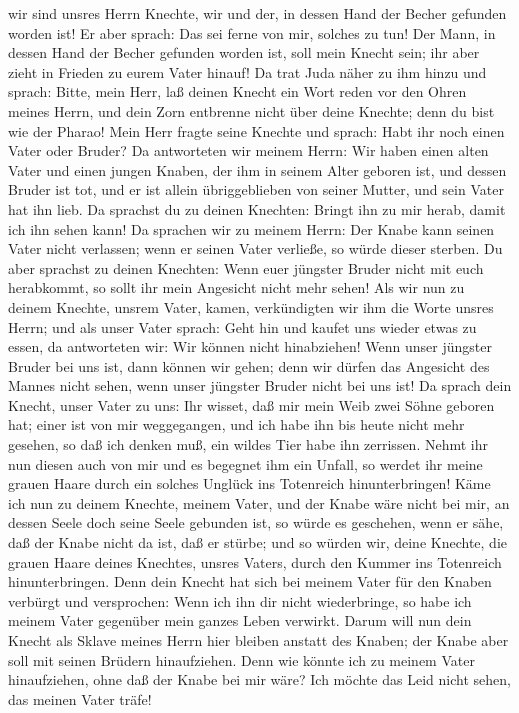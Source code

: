 wir sind unsres Herrn Knechte, wir und der, in dessen Hand der Becher
gefunden worden ist!  Er aber sprach: Das sei ferne von
mir, solches zu tun! Der Mann, in dessen Hand der Becher gefunden worden
ist, soll mein Knecht sein; ihr aber zieht in Frieden zu eurem Vater
hinauf!  Da trat Juda näher zu ihm hinzu und sprach:
Bitte, mein Herr, laß deinen Knecht ein Wort reden vor den Ohren meines
Herrn, und dein Zorn entbrenne nicht über deine Knechte; denn du bist
wie der Pharao!  Mein Herr fragte seine Knechte und
sprach: Habt ihr noch einen Vater oder Bruder?  Da
antworteten wir meinem Herrn: Wir haben einen alten Vater und einen
jungen Knaben, der ihm in seinem Alter geboren ist, und dessen Bruder
ist tot, und er ist allein übriggeblieben von seiner Mutter, und sein
Vater hat ihn lieb.  Da sprachst du zu deinen Knechten:
Bringt ihn zu mir herab, damit ich ihn sehen kann!  Da
sprachen wir zu meinem Herrn: Der Knabe kann seinen Vater nicht
verlassen; wenn er seinen Vater verließe, so würde dieser sterben.
 Du aber sprachst zu deinen Knechten: Wenn euer jüngster
Bruder nicht mit euch herabkommt, so sollt ihr mein Angesicht nicht mehr
sehen!  Als wir nun zu deinem Knechte, unsrem Vater,
kamen, verkündigten wir ihm die Worte unsres Herrn;  und
als unser Vater sprach: Geht hin und kaufet uns wieder etwas zu essen,
 da antworteten wir: Wir können nicht hinabziehen! Wenn
unser jüngster Bruder bei uns ist, dann können wir gehen; denn wir
dürfen das Angesicht des Mannes nicht sehen, wenn unser jüngster Bruder
nicht bei uns ist!  Da sprach dein Knecht, unser Vater zu
uns: Ihr wisset, daß mir mein Weib zwei Söhne geboren hat;
 einer ist von mir weggegangen, und ich habe ihn bis
heute nicht mehr gesehen, so daß ich denken muß, ein wildes Tier habe
ihn zerrissen.  Nehmt ihr nun diesen auch von mir und es
begegnet ihm ein Unfall, so werdet ihr meine grauen Haare durch ein
solches Unglück ins Totenreich hinunterbringen!  Käme ich
nun zu deinem Knechte, meinem Vater, und der Knabe wäre nicht bei mir,
an dessen Seele doch seine Seele gebunden ist,  so würde
es geschehen, wenn er sähe, daß der Knabe nicht da ist, daß er stürbe;
und so würden wir, deine Knechte, die grauen Haare deines Knechtes,
unsres Vaters, durch den Kummer ins Totenreich hinunterbringen.
 Denn dein Knecht hat sich bei meinem Vater für den
Knaben verbürgt und versprochen: Wenn ich ihn dir nicht wiederbringe, so
habe ich meinem Vater gegenüber mein ganzes Leben verwirkt.
 Darum will nun dein Knecht als Sklave meines Herrn hier
bleiben anstatt des Knaben; der Knabe aber soll mit seinen Brüdern
hinaufziehen.  Denn wie könnte ich zu meinem Vater
hinaufziehen, ohne daß der Knabe bei mir wäre? Ich möchte das Leid nicht
sehen, das meinen Vater träfe!

